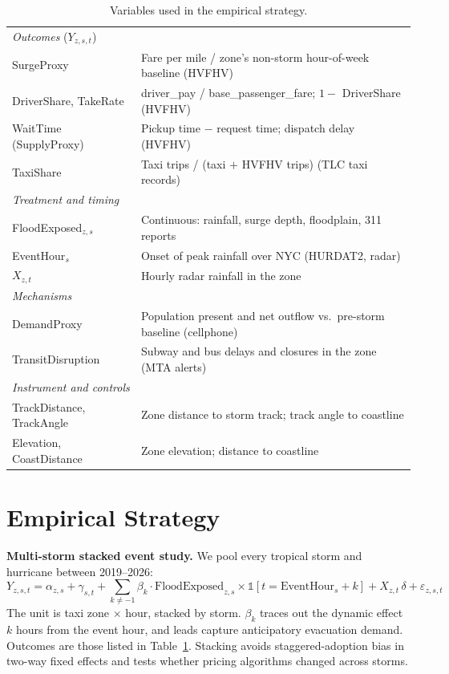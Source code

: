 \documentclass[11pt]{article}
\begin{document}
\begin{table}[h]
\centering
\begin{singlespace}
\footnotesize
\renewcommand{\arraystretch}{0.9}
\setlength{\abovecaptionskip}{4pt}
\begin{tabular}{ll}
\toprule
\multicolumn{2}{l}{\textit{Outcomes} ($Y_{z,s,t}$)} \\
\quad SurgeProxy & Fare per mile / zone's non-storm hour-of-week baseline (HVFHV) \\
\quad DriverShare, TakeRate & driver\_pay / base\_passenger\_fare; $1 -$ DriverShare (HVFHV) \\
\quad WaitTime (SupplyProxy) & Pickup time $-$ request time; dispatch delay (HVFHV) \\
\quad TaxiShare & Taxi trips / (taxi $+$ HVFHV trips) (TLC taxi records) \\
\midrule
\multicolumn{2}{l}{\textit{Treatment and timing}} \\
\quad FloodExposed$_{z,s}$ & Continuous: rainfall, surge depth, floodplain, 311 reports \\
\quad EventHour$_s$ & Onset of peak rainfall over NYC (HURDAT2, radar) \\
\quad $X_{z,t}$ & Hourly radar rainfall in the zone \\
\midrule
\multicolumn{2}{l}{\textit{Mechanisms}} \\
\quad DemandProxy & Population present and net outflow vs.\ pre-storm baseline (cellphone) \\
\quad TransitDisruption & Subway and bus delays and closures in the zone (MTA alerts) \\
\midrule
\multicolumn{2}{l}{\textit{Instrument and controls}} \\
\quad TrackDistance, TrackAngle & Zone distance to storm track; track angle to coastline \\
\quad Elevation, CoastDistance & Zone elevation; distance to coastline \\
\bottomrule
\end{tabular}
\end{singlespace}
\caption{Variables used in the empirical strategy.}
\label{tab:vars}
\end{table}

\section{Empirical Strategy}

\textbf{Multi-storm stacked event study.} We pool every tropical storm and hurricane between 2019--2026:
\begin{equation}
Y_{z,s,t} = \alpha_{z,s} + \gamma_{s,t} + \sum_{k \neq -1} \beta_k \cdot \text{FloodExposed}_{z,s} \times \mathbb{1}[t = \text{EventHour}_s + k] + X_{z,t}\,\delta + \varepsilon_{z,s,t}
\end{equation}
The unit is taxi zone $\times$ hour, stacked by storm. $\beta_k$ traces out the dynamic effect $k$ hours from the event hour, and leads capture anticipatory evacuation demand. Outcomes are those listed in Table~\ref{tab:vars}. Stacking avoids staggered-adoption bias in two-way fixed effects \citep{cengiz2019,callaway2021} and tests whether pricing algorithms changed across storms.
\end{document}
